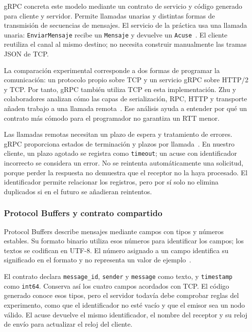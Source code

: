 gRPC concreta este modelo mediante un contrato de servicio y código generado para
cliente y servidor. Permite llamadas unarias y distintas formas de transmisión
de secuencias de mensajes. El servicio de la práctica usa una llamada unaria:
\texttt{EnviarMensaje} recibe un \texttt{Mensaje} y devuelve un
\texttt{Acuse}~\cite{nixon_grpc_conceptos}. El cliente reutiliza el canal al mismo
destino; no necesita construir manualmente las tramas JSON de TCP.

La comparación experimental corresponde a dos formas de programar la comunicación:
un protocolo propio sobre TCP y un servicio gRPC sobre HTTP/2 y TCP. Por tanto,
gRPC también utiliza TCP en esta implementación. Zhu y colaboradores analizan
cómo las capas de serialización, RPC, HTTP y transporte añaden trabajo a una
llamada remota~\cite{nixon_zhu2025_rpc}. Ese análisis ayuda a entender por qué un
contrato más cómodo para el programador no garantiza un RTT menor.

Las llamadas remotas necesitan un plazo de espera y tratamiento de errores.
gRPC proporciona estados de terminación y plazos por llamada~\cite{nixon_grpc_conceptos}.
En nuestro cliente, un plazo agotado se registra como \texttt{timeout}; un acuse
con identificador incorrecto se considera un error. No se reintenta automáticamente
una solicitud, porque perder la respuesta no demuestra que el receptor no la haya
procesado. El identificador permite relacionar los registros, pero por sí solo
no elimina duplicados si en el futuro se añadieran reintentos.

\subsubsection{Protocol Buffers y contrato compartido}
Protocol Buffers describe mensajes mediante campos con tipos y números estables.
Su formato binario utiliza esos números para identificar los campos; los textos
se codifican en UTF-8. El número asignado a un campo identifica su significado en
el formato y no representa un valor de ejemplo~\cite{nixon_protobuf_encoding}.

El contrato  declara \texttt{message\_id},
\texttt{sender} y \texttt{message} como texto, y \texttt{timestamp} como
\texttt{int64}. Conserva así los cuatro campos acordados con TCP. El código
generado conoce esos tipos, pero el servidor todavía debe comprobar reglas del
experimento, como que el identificador no esté vacío y que el emisor sea un nodo
válido. El acuse devuelve el mismo identificador, el nombre del receptor y su
reloj de envío para actualizar el reloj del cliente.

